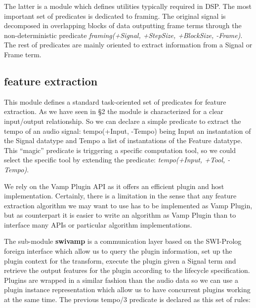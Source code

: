 \documentclass[runningheads]{llncs}
\begin{document}
The latter is a module which defines utilities typically required in DSP. The most important set of predicates is dedicated to framing. The original signal is decomposed in overlapping blocks of data outputting frame terms through the non-deterministic predicate \textit{framing(+Signal, +StepSize, +BlockSize, -Frame)}. The rest of predicates are mainly oriented to extract information from a Signal or Frame term.
 
\subsection{feature extraction}\label{subsec:swivamp}

This module defines a standard task-oriented set of predicates for feature extraction. As we have seen in \S 2 the module is characterized for a clear input/output relationship. So we can declare a simple predicate to extract the tempo of an audio signal: tempo(+Input, -Tempo) being Input an instantation of the Signal datatype and Tempo a list of instantations of the Feature datatype. This ``magic'' predicate is triggering a specific computation tool, so we could select the specific tool by extending the predicate: \textit{tempo(+Input, +Tool, -Tempo)}.

We rely on the Vamp Plugin API as it offers an efficient plugin and host implementation. Certainly, there is a limitation in the sense that any feature extraction algorithm we may want to use has to be implemented as Vamp Plugin, but as counterpart it is easier to write an algorithm as Vamp Plugin than to interface many APIs or particular algorithm implementations.

The sub-module \textbf{swivamp} is a communication layer based on the SWI-Prolog foreign interface which allow us to query the plugin information, set up the plugin context for the transform, execute the plugin given a Signal term and retrieve the output features for the plugin according to the lifecycle specification. Plugins are wrapped in a similar fashion than the audio data so we can use a plugin instance representation which allow us to have concurrent plugins working at the same time. The previous tempo/3 predicate is declared as this set of rules:

\medskip

\noindent
\end{document}
